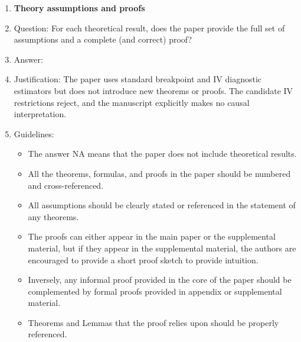 \begin{enumerate}
\item {\bf Theory assumptions and proofs}
    \item[] Question: For each theoretical result, does the paper provide the full set of assumptions and a complete (and correct) proof?
    \item[] Answer: \answerNA{}
    \item[] Justification: The paper uses standard breakpoint and IV diagnostic estimators but does not introduce new theorems or proofs. The candidate IV restrictions reject, and the manuscript explicitly makes no causal interpretation.
    \item[] Guidelines:
    \begin{itemize}
        \item The answer NA means that the paper does not include theoretical results.
        \item All the theorems, formulas, and proofs in the paper should be numbered and cross-referenced.
        \item All assumptions should be clearly stated or referenced in the statement of any theorems.
        \item The proofs can either appear in the main paper or the supplemental material, but if they appear in the supplemental material, the authors are encouraged to provide a short proof sketch to provide intuition.
        \item Inversely, any informal proof provided in the core of the paper should be complemented by formal proofs provided in appendix or supplemental material.
        \item Theorems and Lemmas that the proof relies upon should be properly referenced.
    \end{itemize}


\end{enumerate}
